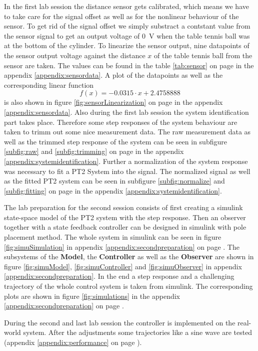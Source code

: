 In the first lab session the distance sensor gets calibrated, which means we have to take care for the signal offset as well as for the nonlinear behaviour of the sensor. To get rid of the signal offset we simply substract a contstant value from the sensor signal to get an output voltage of \SI{0}{V} when the table tennis ball was at the bottom of the cylinder. To linearize the sensor output, nine datapoints of the sensor output voltage against the distance $x$ of the table tennis ball from the sensor are taken. The values can be found in the table \ref{tab:sensor} on page \pageref{appendix:sensordata} in the appendix \ref{appendix:sensordata}. A plot of the datapoints as well as the corresponding linear function 
\begin{equation}
    f(x) = -0.0315\cdot x + 2.4758888
    \label{eqn:linearfunction }
\end{equation}
is also shown in figure \ref{fig:sensorLinearization} on page \pageref{appendix:sensordata} in the appendix \ref{appendix:sensordata}. Also during the first lab session the system identification part takes place. Therefore some step responses of the system behaviour are taken to trimm out some nice measurement data. The raw measurement data as well as the trimmed step response of the system can be seen in subfigure \ref{subfig:raw} and \ref{subfig:trimming} on page \pageref{appendix:systemidentification} in the appendix \ref{appendix:systemidentification}. Further a normalization of the system response was necessary to fit a PT2 System into the signal. The normalized signal as well as the fitted PT2 system can be seen in subfigure \ref{subfig:normalize} and \ref{subfig:fitting} on page \pageref{appendix:systemidentification} in the appendix \ref{appendix:systemidentification}.

The lab preparation for the second session consists of first creating a simulink state-space model of the PT2 system with the step response. Then an observer together with a state feedback controller can be designed in simulink with pole placement method. The whole system in simulink can be seen in figure \ref{fig:simuSimulation} in appendix \ref{appendix:secondpreparation} on page \pageref{fig:simuSimulation}. The subsystems of the \textbf{Model}, the \textbf{Controller} as well as the \textbf{Observer} are shown in figure \ref{fig:simuModel}, \ref{fig:simuController} and \ref{fig:simuObserver} in appendix \ref{appendix:secondpreparation}. In the end a step response and a challenging trajectory of the whole control system is taken from simulink. The corresponding plots are shown in figure \ref{fig:simulations} in the appendix \ref{appendix:secondpreparation} on page \pageref{fig:simulations}.

During the second and last lab session the controller is implemented on the real-world system. After the adjustments some trajectories like a sine wave are tested (appendix \ref{appendix:performance} on page \pageref{appendix:performance}).

